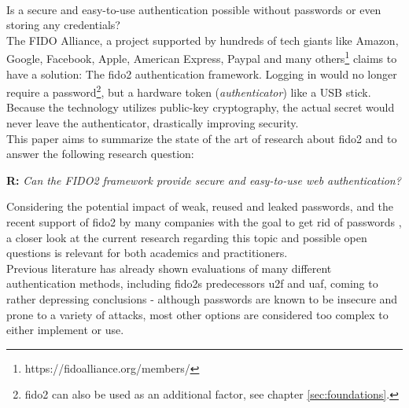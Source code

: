 \\
Is a secure and easy-to-use authentication possible without passwords or even storing any credentials?\\
The FIDO Alliance, a project supported by hundreds of tech giants like Amazon, Google, Facebook, Apple, American Express, Paypal and many others\footnote{https://fidoalliance.org/members/} claims to have a solution: The \ac{fido2} authentication framework. Logging in would no longer require a password\footnote{\ac{fido2} can also be used as an additional factor, see chapter \ref{sec:foundations}.}, but a hardware token (\emph{authenticator}) like a USB stick. Because the technology utilizes public-key cryptography, the actual secret would never leave the authenticator, drastically improving security.\\
This paper aims to summarize the state of the art of research about \ac{fido2} and to answer the following research question:

\begin{displayquote}
    \textbf{R:} \emph{Can the FIDO2 framework provide secure and easy-to-use web authentication?}
\end{displayquote}

\noindent Considering the potential impact of weak, reused and leaked passwords, and the recent support of \ac{fido2} by many companies with the goal to get rid of passwords \cite{ng2019,mingis2020,mehta2018,fido2_overview}, a closer look at the current research regarding this topic and possible open questions is relevant for both academics and practitioners.\\
Previous literature has already shown evaluations of many different authentication methods, including \acp{fido2} predecessors \ac{u2f} and \ac{uaf}, coming to rather depressing conclusions \cite{bonneau2012,hunt2018a,lang2017,das2018} - although passwords are known to be insecure and prone to a variety of attacks, most other options are considered too complex to either implement or use.